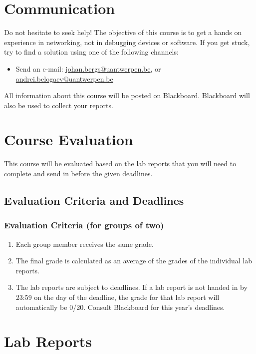 \section{Communication}

Do not hesitate to seek help! The objective of this course is to get a hands on experience in networking, not in debugging devices or software. If you get stuck, try to find a solution using one of the following channels:

\begin{itemize}
	\item Send an e-mail: \href{mailto:johan.bergs@uantwerpen.be}{johan.bergs@uantwerpen.be}, or \href{mailto:andrei.belogaev@uantwerpen.be}{andrei.belogaev@uantwerpen.be}
\end{itemize}

All information about this course will be posted on Blackboard. Blackboard will also be used to collect your reports.

\section{Course Evaluation}

This course will be evaluated based on the lab reports that you will need to complete and send in before the given deadlines.

\subsection*{Evaluation Criteria and Deadlines}
\subsubsection{Evaluation Criteria (for groups of two)}
\begin{enumerate}
\item Each group member receives the same grade.
\item The final grade is calculated as an average of the grades of the individual lab reports.
\item The lab reports are subject to deadlines. If a lab report is not handed in by 23:59 on the day of the deadline, the grade for that lab report will automatically be 0/20. Consult Blackboard for this year's deadlines.
\end{enumerate}

\section{Lab Reports}


